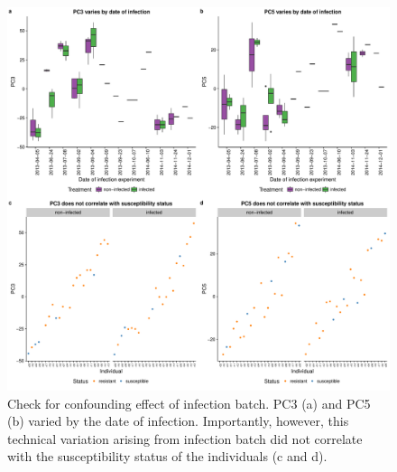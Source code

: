 \documentclass[fleqn,10pt]{wlscirep}
\begin{document}
\begin{figure}[ht]
\centering
\includegraphics[width=\linewidth]{../figure/batch-infection.pdf}
\caption{
Check for confounding effect of infection batch. PC3 (a) and PC5 (b) varied by the date of infection. Importantly, however, this technical variation arising from infection batch did not correlate with the susceptibility status of the individuals (c and d).
}
\label{fig:infection}
\end{figure}
\end{document}
